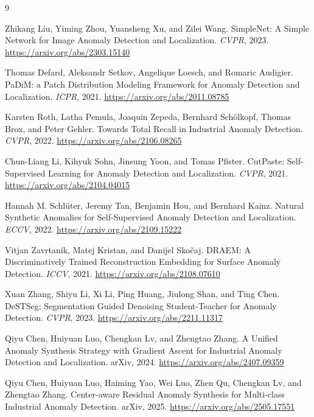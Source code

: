 \documentclass[11pt]{article}
\begin{document}
\begin{thebibliography}{9}

Zhikang Liu, Yiming Zhou, Yuansheng Xu, and Zilei Wang.
\newblock SimpleNet: A Simple Network for Image Anomaly Detection and
Localization.
\newblock \emph{CVPR}, 2023.
\newblock \url{https://arxiv.org/abs/2303.15140}

Thomas Defard, Aleksandr Setkov, Angelique Loesch, and Romaric Audigier.
\newblock PaDiM: a Patch Distribution Modeling Framework for Anomaly Detection
and Localization.
\newblock \emph{ICPR}, 2021.
\newblock \url{https://arxiv.org/abs/2011.08785}

Karsten Roth, Latha Pemula, Joaquin Zepeda, Bernhard Schölkopf, Thomas Brox,
and Peter Gehler.
\newblock Towards Total Recall in Industrial Anomaly Detection.
\newblock \emph{CVPR}, 2022.
\newblock \url{https://arxiv.org/abs/2106.08265}

Chun-Liang Li, Kihyuk Sohn, Jinsung Yoon, and Tomas Pfister.
\newblock CutPaste: Self-Supervised Learning for Anomaly Detection and
Localization.
\newblock \emph{CVPR}, 2021.
\newblock \url{https://arxiv.org/abs/2104.04015}

Hannah M. Schl\"uter, Jeremy Tan, Benjamin Hou, and Bernhard Kainz.
\newblock Natural Synthetic Anomalies for Self-Supervised Anomaly Detection and
Localization.
\newblock \emph{ECCV}, 2022.
\newblock \url{https://arxiv.org/abs/2109.15222}

Vitjan Zavrtanik, Matej Kristan, and Danijel Sko\v{c}aj.
\newblock DRAEM: A Discriminatively Trained Reconstruction Embedding for Surface
Anomaly Detection.
\newblock \emph{ICCV}, 2021.
\newblock \url{https://arxiv.org/abs/2108.07610}

Xuan Zhang, Shiyu Li, Xi Li, Ping Huang, Jiulong Shan, and Ting Chen.
\newblock DeSTSeg: Segmentation Guided Denoising Student-Teacher for Anomaly
Detection.
\newblock \emph{CVPR}, 2023.
\newblock \url{https://arxiv.org/abs/2211.11317}

Qiyu Chen, Huiyuan Luo, Chengkan Lv, and Zhengtao Zhang.
\newblock A Unified Anomaly Synthesis Strategy with Gradient Ascent for
Industrial Anomaly Detection and Localization.
\newblock arXiv, 2024.
\newblock \url{https://arxiv.org/abs/2407.09359}

Qiyu Chen, Huiyuan Luo, Haiming Yao, Wei Luo, Zhen Qu, Chengkan Lv, and
Zhengtao Zhang.
\newblock Center-aware Residual Anomaly Synthesis for Multi-class Industrial
Anomaly Detection.
\newblock arXiv, 2025.
\newblock \url{https://arxiv.org/abs/2505.17551}

\end{thebibliography}
\end{document}
